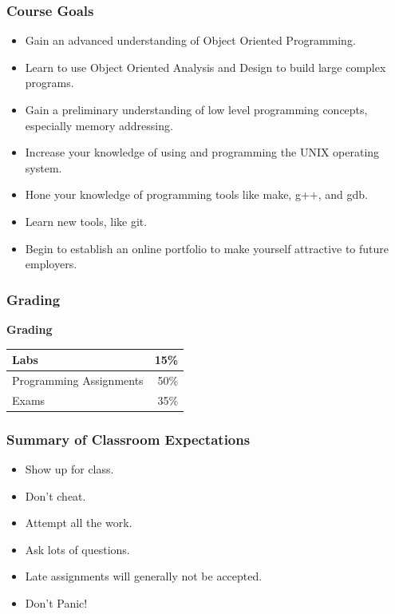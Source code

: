 \documentclass[handout]{beamer}
\begin{document}
\begin{frame}
   \frametitle{Course Goals}
   \begin{itemize}
      \item Gain an advanced understanding of Object Oriented Programming.
      \item Learn to use Object Oriented Analysis and Design to build large complex 
            programs. 
      \item Gain a preliminary understanding of low level programming concepts,
            especially memory addressing.
      \item Increase your knowledge of using and programming the UNIX operating       
            system.
      \item Hone your knowledge of programming tools like make, g++, and gdb.
      \item Learn new tools, like git.
      \item Begin to establish an online portfolio to make yourself attractive to future employers.
   \end{itemize}
\end{frame}

\begin{frame}
    \frametitle{Grading}
    \textbf{Grading}
    
    \begin{tabular}{|l|r|}
       \hline
       Labs & 15\%\\
       \hline
       Programming Assignments & 50\%\\
       \hline
       Exams & 35\%\\
       \hline
    \end{tabular}
\end{frame}

\begin{frame}
   \frametitle{Summary of Classroom Expectations}
   \begin{itemize}
      \item Show up for class.
      \item Don't cheat.
      \item Attempt all the work.
      \item Ask lots of questions.
      \item Late assignments will generally not be accepted.
      \item Don't Panic!
   \end{itemize}
\end{frame}
\end{document}
